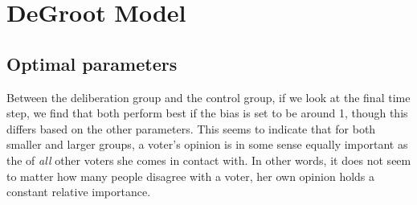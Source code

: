 %
%

\section{DeGroot Model}
\label{degroot_results}
\subsection{Optimal parameters}

Between the deliberation group and the control group, if we look at the final
time step, we find that both perform best if the bias is set to be around 1,
though this differs based on the other parameters. This seems to indicate that
for both smaller and larger groups, a voter's opinion is in some sense equally
important as the of  \textit{all} other voters she comes in contact with. In
other words, it does not seem to matter how many people disagree with a voter,
her own opinion holds a constant relative importance.

